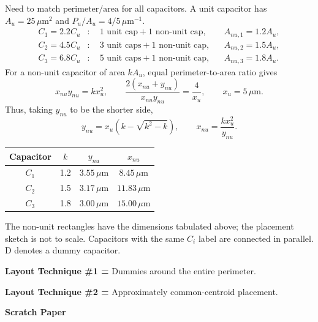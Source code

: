Need to match $\text{perimeter}/\text{area}$ for all capacitors. A unit capacitor has $A_u=25\,\mu\mathrm m^2$ and $P_u/A_u=4/5\,\mu\mathrm m^{-1}$.
\begin{align*}
C_1=2.2C_u&:\quad1\text{ unit cap}+1\text{ non-unit cap},&&A_{nu,1}=1.2A_u,\\
C_2=4.5C_u&:\quad3\text{ unit caps}+1\text{ non-unit cap},&&A_{nu,2}=1.5A_u,\\
C_3=6.8C_u&:\quad5\text{ unit caps}+1\text{ non-unit cap},&&A_{nu,3}=1.8A_u.
\end{align*}
For a non-unit capacitor of area $kA_u$, equal perimeter-to-area ratio gives
\[
x_{nu}y_{nu}=k x_u^2,\qquad
\frac{2(x_{nu}+y_{nu})}{x_{nu}y_{nu}}=\frac4{x_u},\qquad x_u=5\,\mu\mathrm m.
\]
Thus, taking $y_{nu}$ to be the shorter side,
\[
y_{nu}=x_u\left(k-\sqrt{k^2-k}\right),\qquad
x_{nu}=\frac{kx_u^2}{y_{nu}}.
\]
\begin{center}
\begin{tabular}{c c c c}
\toprule
Capacitor & $k$ & $y_{nu}$ & $x_{nu}$\\
\midrule
$C_1$&1.2&$3.55\,\mu\mathrm m$&$8.45\,\mu\mathrm m$\\
$C_2$&1.5&$3.17\,\mu\mathrm m$&$11.83\,\mu\mathrm m$\\
$C_3$&1.8&$3.00\,\mu\mathrm m$&$15.00\,\mu\mathrm m$\\
\bottomrule
\end{tabular}
\end{center}

\begin{center}
\end{center}
The non-unit rectangles have the dimensions tabulated above; the placement sketch is not to scale. Capacitors with the same $C_i$ label are connected in parallel. D denotes a dummy capacitor.

\textbf{Layout Technique \#1 =} Dummies around the entire perimeter.\par
\textbf{Layout Technique \#2 =} Approximately common-centroid placement.
\endgroup
\newpage

\begin{center}
{\sffamily\bfseries\Large Scratch Paper}
\end{center}
\null\vfill
\clearpage
